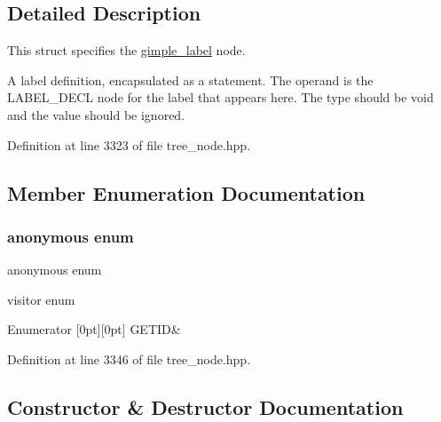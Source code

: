 \subsection{Detailed Description}
This struct specifies the \hyperlink{structgimple__label}{gimple\+\_\+label} node. 

A label definition, encapsulated as a statement. The operand is the L\+A\+B\+E\+L\+\_\+\+D\+E\+CL node for the label that appears here. The type should be void and the value should be ignored. 

Definition at line 3323 of file tree\+\_\+node.\+hpp.



\subsection{Member Enumeration Documentation}
\mbox{\label{structgimple__label_a4080bc1de9cc7cea049ca5e8293fabc5}} 
\subsubsection{\texorpdfstring{anonymous enum}{anonymous enum}}
{\footnotesize\ttfamily anonymous enum}



visitor enum 

\begin{DoxyEnumFields}{Enumerator}
[0pt][0pt]{}\mbox{\label{structgimple__label_a4080bc1de9cc7cea049ca5e8293fabc5ac85e61f23f199699b2a955b97e6c1a0f}} 
G\+E\+T\+ID&\\
\hline

\end{DoxyEnumFields}


Definition at line 3346 of file tree\+\_\+node.\+hpp.



\subsection{Constructor \& Destructor Documentation}
\mbox{\label{structgimple__label_adcef9a662ab704a8d762584fb3ae51e0}} 
